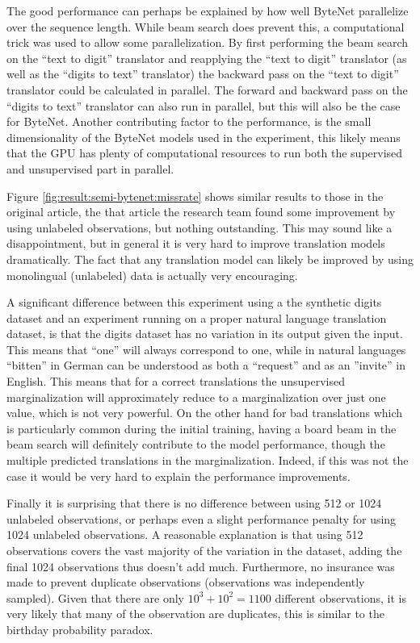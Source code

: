 The good performance can perhaps be explained by how well ByteNet parallelize over the sequence length. While beam search does prevent this, a computational trick was used to allow some parallelization. By first performing the beam search on the ``text to digit'' translator and reapplying the ``text to digit'' translator (as well as the ``digits to text'' translator) the backward pass on the ``text to digit'' translator could be calculated in parallel. The forward and backward pass on the ``digits to text'' translator can also run in parallel, but this will also be the case for ByteNet. Another contributing factor to the performance, is the small dimensionality of the ByteNet models used in the experiment, this likely means that the GPU has plenty of computational resources to run both the supervised and unsupervised part in parallel.

Figure \ref{fig:result:semi-bytenet:missrate} shows similar results to those in the original article, the that article the research team found some improvement by using unlabeled observations, but nothing outstanding. This may sound like a disappointment, but in general it is very hard to improve translation models dramatically. The fact that any translation model can likely be improved by using monolingual (unlabeled) data is actually very encouraging.

A significant difference between this experiment using a the synthetic digits dataset and an experiment running on a proper natural language translation dataset, is that the digits dataset has no variation in its output given the input. This means that ``one'' will always correspond to one, while in natural languages ``bitten'' in German can be understood as both a ``request'' and as an ''invite'' in English. This means that for a correct translations the unsupervised marginalization will approximately reduce to a marginalization over just one value, which is not very powerful. On the other hand for bad translations which is particularly common during the initial training, having a board beam in the beam search will definitely contribute to the model performance, though the multiple predicted translations in the marginalization. Indeed, if this was not the case it would be very hard to explain the performance improvements. 


Finally it is surprising that there is no difference between using 512 or 1024 unlabeled observations, or perhaps even a slight performance penalty for using 1024 unlabeled observations. A reasonable explanation is that using 512 observations covers the vast majority of the variation in the dataset, adding the final 1024 observations thus doesn't add much. Furthermore, no insurance was made to prevent duplicate observations (observations was independently sampled). Given that there are only $10^3 + 10^2 = 1100$ different observations, it is very likely that many of the observation are duplicates, this is similar to the birthday probability paradox.